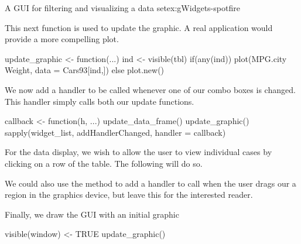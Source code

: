 \begin{example}{A GUI for filtering and visualizing a data set}{ex:gWidgets-spotfire}

This next function is used to update the graphic. A real application
would provide a more compelling plot.
\begin{Schunk}
\begin{Sinput}
 update_graphic <- function(...) {
   ind <- visible(tbl)
   if(any(ind))
     plot(MPG.city ~ Weight, data = Cars93[ind,])
   else
     plot.new()
 }
\end{Sinput}
\end{Schunk}

We now add a handler to be called whenever one of our combo boxes is
changed. This handler simply calls both our update functions.
\begin{Schunk}
\begin{Sinput}
 callback <- function(h, ...) {
   update_data_frame()
   update_graphic()
 }
 sapply(widget_list, addHandlerChanged, handler = callback)
\end{Sinput}
\end{Schunk}
%
For the data display, we wish to allow the user to view individual cases
by clicking on a row of the table. The following will do so.

\begin{Schunk}
\end{Schunk}
%
We could also use the  method to
add a handler to call when the user drags our a region in the graphics
device, but leave this for the interested reader.


Finally, we draw the GUI with an initial graphic
\begin{Schunk}
\begin{Sinput}
 visible(window) <- TRUE
 update_graphic()
\end{Sinput}
\end{Schunk}
\end{example}

